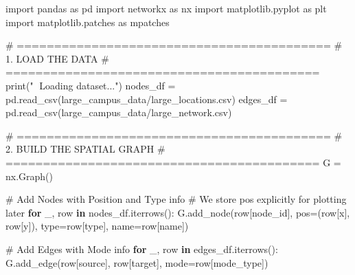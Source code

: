 \documentclass[
  letterpaper,
  DIV=11,
  numbers=noendperiod]{scrreprt}
\newenvironment{Shaded}{\begin{snugshade}}{\end{snugshade}}
\newcommand{\BuiltInTok}[1]{\textcolor[rgb]{0.00,0.23,0.31}{#1}}
\newcommand{\CommentTok}[1]{\textcolor[rgb]{0.37,0.37,0.37}{#1}}
\newcommand{\ControlFlowTok}[1]{\textcolor[rgb]{0.00,0.23,0.31}{\textbf{#1}}}
\newcommand{\ImportTok}[1]{\textcolor[rgb]{0.00,0.46,0.62}{#1}}
\newcommand{\KeywordTok}[1]{\textcolor[rgb]{0.00,0.23,0.31}{\textbf{#1}}}
\newcommand{\NormalTok}[1]{\textcolor[rgb]{0.00,0.23,0.31}{#1}}
\newcommand{\OperatorTok}[1]{\textcolor[rgb]{0.37,0.37,0.37}{#1}}
\newcommand{\StringTok}[1]{\textcolor[rgb]{0.13,0.47,0.30}{#1}}
\begin{document}
\begin{Shaded}
\begin{Highlighting}[]
\ImportTok{import}\NormalTok{ pandas }\ImportTok{as}\NormalTok{ pd}
\ImportTok{import}\NormalTok{ networkx }\ImportTok{as}\NormalTok{ nx}
\ImportTok{import}\NormalTok{ matplotlib.pyplot }\ImportTok{as}\NormalTok{ plt}
\ImportTok{import}\NormalTok{ matplotlib.patches }\ImportTok{as}\NormalTok{ mpatches}

\CommentTok{\# ==========================================}
\CommentTok{\# 1. LOAD THE DATA}
\CommentTok{\# ==========================================}
\BuiltInTok{print}\NormalTok{(}\StringTok{"📂 Loading dataset..."}\NormalTok{)}
\NormalTok{nodes\_df }\OperatorTok{=}\NormalTok{ pd.read\_csv(}\StringTok{\textquotesingle{}large\_campus\_data/large\_locations.csv\textquotesingle{}}\NormalTok{)}
\NormalTok{edges\_df }\OperatorTok{=}\NormalTok{ pd.read\_csv(}\StringTok{\textquotesingle{}large\_campus\_data/large\_network.csv\textquotesingle{}}\NormalTok{)}

\CommentTok{\# ==========================================}
\CommentTok{\# 2. BUILD THE SPATIAL GRAPH}
\CommentTok{\# ==========================================}
\NormalTok{G }\OperatorTok{=}\NormalTok{ nx.Graph()}

\CommentTok{\# Add Nodes with Position and Type info}
\CommentTok{\# We store \textquotesingle{}pos\textquotesingle{} explicitly for plotting later}
\ControlFlowTok{for}\NormalTok{ \_, row }\KeywordTok{in}\NormalTok{ nodes\_df.iterrows():}
\NormalTok{    G.add\_node(row[}\StringTok{\textquotesingle{}node\_id\textquotesingle{}}\NormalTok{], }
\NormalTok{               pos}\OperatorTok{=}\NormalTok{(row[}\StringTok{\textquotesingle{}x\textquotesingle{}}\NormalTok{], row[}\StringTok{\textquotesingle{}y\textquotesingle{}}\NormalTok{]), }
               \BuiltInTok{type}\OperatorTok{=}\NormalTok{row[}\StringTok{\textquotesingle{}type\textquotesingle{}}\NormalTok{],}
\NormalTok{               name}\OperatorTok{=}\NormalTok{row[}\StringTok{\textquotesingle{}name\textquotesingle{}}\NormalTok{])}

\CommentTok{\# Add Edges with Mode info}
\ControlFlowTok{for}\NormalTok{ \_, row }\KeywordTok{in}\NormalTok{ edges\_df.iterrows():}
\NormalTok{    G.add\_edge(row[}\StringTok{\textquotesingle{}source\textquotesingle{}}\NormalTok{], row[}\StringTok{\textquotesingle{}target\textquotesingle{}}\NormalTok{], }
\NormalTok{               mode}\OperatorTok{=}\NormalTok{row[}\StringTok{\textquotesingle{}mode\_type\textquotesingle{}}\NormalTok{])}


\end{Highlighting}
\end{Shaded}
\end{document}
